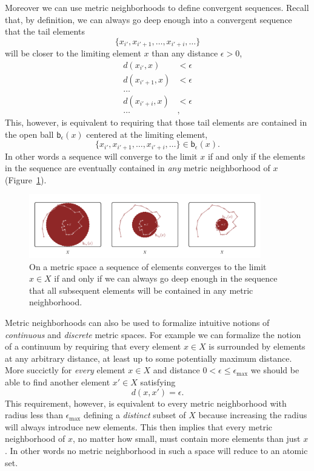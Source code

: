 \documentclass[
  letterpaper,
  DIV=11,
  numbers=noendperiod]{scrartcl}
\begin{document}
Moreover we can use metric neighborhoods to define convergent sequences.
Recall that, by definition, we can always go deep enough into a
convergent sequence that the tail elements \[
\{ x_{i'}, x_{i' + 1}, \ldots, x_{i' + i}, \ldots \}
\] will be closer to the limiting element \(x\) than any distance
\(\epsilon > 0\), \begin{align*}
d(x_{i'}, x) &< \epsilon
\\
d(x_{i' + 1}, x) &< \epsilon
\\
\ldots&
\\
d(x_{i' + i}, x) &< \epsilon
\\
\ldots&,
\end{align*} This, however, is equivalent to requiring that those tail
elements are contained in the open ball \(\mathsf{b}_{\epsilon}(x)\)
centered at the limiting element, \[
\{ x_{i'}, x_{i' + 1}, \ldots, x_{i' + i}, \ldots \}
\in \mathsf{b}_{\epsilon}(x).
\] In other words a sequence will converge to the limit \(x\) if and
only if the elements in the sequence are eventually contained in
\emph{any} metric neighborhood of \(x\)
(Figure~\ref{fig-metric-neighborhood-convergence}).

\begin{figure}

{\centering \includegraphics[width=0.9\textwidth,height=\textheight]{figures/structures/metric_topology/convergence/convergence.pdf}

}

\caption{\label{fig-metric-neighborhood-convergence}On a metric space a
sequence of elements converges to the limit \(x \in X\) if and only if
we can always go deep enough in the sequence that all subsequent
elements will be contained in any metric neighborhood.}

\end{figure}

Metric neighborhoods can also be used to formalize intuitive notions of
\emph{continuous} and \emph{discrete} metric spaces. For example we can
formalize the notion of a continuum by requiring that every element
\(x \in X\) is surrounded by elements at any arbitrary distance, at
least up to some potentially maximum distance. More succictly for
\emph{every} element \(x \in X\) and distance
\(0 < \epsilon \le \epsilon_{\max}\) we should be able to find another
element \(x' \in X\) satisfying \[
d(x, x') = \epsilon.
\] This requirement, however, is equivalent to every metric neighborhood
with radius less than \(\epsilon_{\max}\) defining a \emph{distinct}
subset of \(X\) because increasing the radius will always introduce new
elements. This then implies that every metric neighborhood of \(x\), no
matter how small, must contain more elements than just \(x\). In other
words no metric neighborhood in such a space will reduce to an atomic
set.
\end{document}
